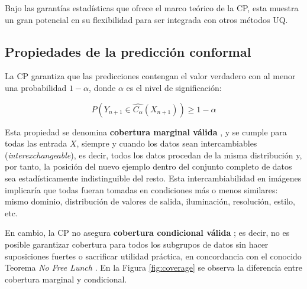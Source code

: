 Bajo las garantías estadísticas que ofrece el marco teórico de la CP, esta muestra un gran potencial en su
flexibilidad para ser integrada con otros métodos UQ. 



\subsection{Propiedades de la predicción conformal}

La CP garantiza que las predicciones contengan el valor verdadero con al menor una probabilidad $1-\alpha$, 
donde $\alpha$ es el nivel de significación:

$$
P(Y_{n+1} \in \hat{C_\alpha}(X_{n+1})) \ge 1 - \alpha
$$

Esta propiedad se denomina \textbf{cobertura marginal válida} \cite{prinster2024}, y se cumple para todas las 
entrada $X$, siempre y cuando los datos sean intercambiables (\textit{interexchangeable}), es decir, todos los 
datos procedan de la misma distribución y, por tanto, la posición del nuevo ejemplo dentro del conjunto 
completo de datos sea estadísticamente indistinguible del resto. Esta intercambiabilidad en imágenes 
implicaría que todas fueran tomadas en condiciones más o menos similares: mismo dominio, distribución de 
valores de salida, iluminación, resolución, estilo, etc.

En cambio, la CP no asegura \textbf{cobertura condicional válida} \cite{foygel2021}; es decir, no es posible 
garantizar cobertura para todos los subgrupos de datos sin hacer suposiciones fuertes o sacrificar utilidad 
práctica, en concordancia con el conocido Teorema \textit{No Free Lunch} \cite{wolpert1997}. En la Figura
\ref{fig:coverage} se observa la diferencia entre cobertura marginal y condicional. 

